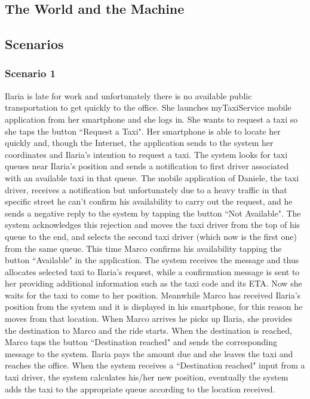 \documentclass[a4paper,12pt]{article}%
\begin{document}
\subsection{The World and the Machine}
\subsection{Scenarios}
\subsubsection{Scenario 1}
Ilaria is late for work and unfortunately there is no available public transportation to get quickly to the office. She launches myTaxiService mobile application from her smartphone and she logs in.
She wants to request a taxi so she taps the button ``Request a Taxi".
Her smartphone is able to locate her quickly and, though the Internet, the application sends to the system her coordinates and Ilaria's intention to request a taxi. The system looks for taxi queues near Ilaria's position and sends a notification to first driver associated with an available taxi in that queue.
The mobile application of Daniele, the taxi driver, receives a notification but unfortunately due to a heavy traffic in that specific street he can't confirm his availability to carry out the request, and he sends a negative reply to the system by tapping the button ``Not Available".
The system acknowledges this rejection and moves the taxi driver from the top of his queue to the end, and selects the second taxi driver (which now is the first one) from the same queue.
This time Marco confirms his availability tapping the button ``Available" in the application. The system receives the message and thus allocates selected taxi to Ilaria's request, while a confirmation message is sent to her providing additional information such as the taxi code and its ETA. Now she waits for the taxi to come to her position.
Meanwhile Marco has received Ilaria's position from the system and it is displayed in his smartphone, for this reason he moves from that location.
When Marco arrives he picks up Ilaria, she provides the destination to Marco and the ride starts.
When the destination is reached, Marco taps the button ``Destination reached" and sends the corresponding message to the system. Ilaria pays the amount due and she leaves the taxi and reaches the office. When the system receives a ``Destination reached" input from a taxi driver, the system calculates his/her new position, eventually the system adds the taxi to the appropriate queue according to the location received.
\end{document}
